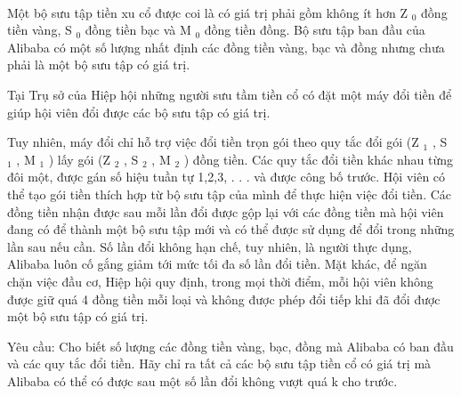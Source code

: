  

Một bộ sưu tập tiền xu cổ được coi là có giá trị phải gồm không ít hơn Z $_ 0 $ đồng tiền vàng, S $_ 0 $ đồng tiền bạc và M $_ 0 $ đồng tiền đồng. Bộ sưu tập ban đầu của Alibaba có một số lượng nhất định các đồng tiền vàng, bạc và đồng nhưng chưa phải là một bộ sưu tập có giá trị.

Tại Trụ sở của Hiệp hội những người sưu tầm tiền cổ có đặt một máy đổi tiền để giúp hội viên đổi được các bộ sưu tập có giá trị.

Tuy nhiên, máy đổi chỉ hỗ trợ việc đổi tiền trọn gói theo quy tắc đổi gói (Z $_ 1 $ , S $_ 1 $ , M $_ 1 $ ) lấy gói (Z $_ 2 $ , S $_ 2 $ , M $_ 2 $ ) đồng tiền. Các quy tắc đổi tiền khác nhau từng đôi một, được gán số hiệu tuần tự 1,2,3, . . . và được công bố trước. Hội viên có thể tạo gói tiền thích hợp từ bộ sưu tập của mình để thực hiện việc đổi tiền. Các đồng tiền nhận được sau mỗi lần đổi được gộp lại với các đồng tiền mà hội viên đang có để thành một bộ sưu tập mới và có thể được sử dụng để đổi trong những lần sau nếu cần. Số lần đổi không hạn chế, tuy nhiên, là người thực dụng, Alibaba luôn cố gắng giảm tới mức tối đa số lần đổi tiền. Mặt khác, để ngăn chặn việc đầu cơ, Hiệp hội quy định, trong mọi thời điểm, mỗi hội viên không được giữ quá 4 đồng tiền mỗi loại và không được phép đổi tiếp khi đã đổi được một bộ sưu tập có giá trị.

Yêu cầu: Cho biết số lượng các đồng tiền vàng, bạc, đồng mà Alibaba có ban đầu và các quy tắc đổi tiền. Hãy chỉ ra tất cả các bộ sưu tập tiền cổ có giá trị mà Alibaba có thể có được sau một số lần đổi không vượt quá k cho trước.

\